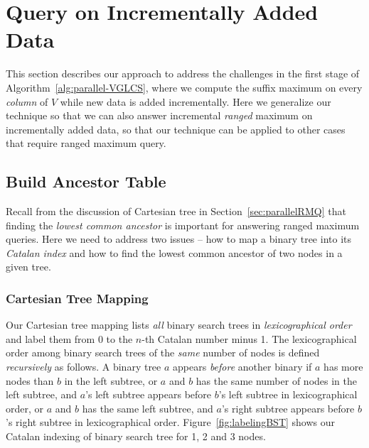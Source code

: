 \section{Query on Incrementally Added Data} \label{sec:QIUD}

This section describes our approach to address the challenges in the
first stage of Algorithm~\ref{alg:parallel-VGLCS}, where we compute
the suffix maximum on every {\em column} of $V$ while new data is
added incrementally.  Here we generalize our technique so that we can
also answer incremental {\em ranged} maximum on incrementally added
data, so that our technique can be applied to other cases that require
ranged maximum query.

%

\subsection{Build Ancestor Table}

Recall from the discussion of Cartesian tree in
Section~\ref{sec:parallelRMQ} that finding the {\em lowest common
  ancestor} is important for answering ranged maximum queries.  Here
we need to address two issues -- how to map a binary tree into its
{\em Catalan index} and how to find the lowest common ancestor of two
nodes in a given tree.


\subsubsection{Cartesian Tree Mapping}

Our Cartesian tree mapping lists {\em all} binary search trees in {\em
  lexicographical order} and label them from $0$ to the $n$-th Catalan
number minus 1.  The lexicographical order among binary search trees
of the {\em same} number of nodes is defined {\em recursively} as
follows.  A binary tree $a$ appears {\em before} another binary if $a$
has more nodes than $b$ in the left subtree, or $a$ and $b$ has the
same number of nodes in the left subtree, and $a$'s left subtree
appears before $b$'s left subtree in lexicographical order, or $a$ and
$b$ has the same left subtree, and $a$'s right subtree appears before
$b$'s right subtree in lexicographical order.
Figure~\ref{fig:labelingBST} shows our Catalan indexing of binary
search tree for 1, 2 and 3 nodes.

